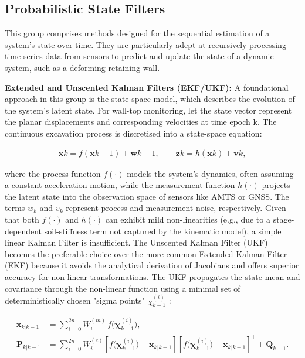 \documentclass[preprint,11pt,authoryear,3p]{elsarticle}
\begin{document}
\subsection{Probabilistic State Filters}

This group comprises methods designed for the sequential estimation of a system's state over time. They are particularly adept at recursively processing time-series data from sensors to predict and update the state of a dynamic system, such as a deforming retaining wall.

\textbf{Extended and Unscented Kalman Filters (EKF/UKF):} A foundational approach in this group is the state-space model, which describes the evolution of the system's latent state. For wall-top monitoring, let the state vector  represent the planar displacements and corresponding velocities at time epoch k. The continuous excavation process is discretised into a state-space equation:

\begin{align}
\mathbf{x}{k}=f(\mathbf{x}{k-1})+\mathbf{w}{k-1},
\qquad
\mathbf{z}{k}=h(\mathbf{x}{k})+\mathbf{v}{k},
\end{align}

where the process function $f(\cdot)$ models the system's dynamics, often assuming a constant-acceleration motion, while the measurement function $h(\cdot)$ projects the latent state into the observation space of sensors like AMTS or GNSS. The terms $w_k$ and $v_k$ represent process and measurement noise, respectively.
Given that both $f(\cdot)$ and $h(\cdot)$ can exhibit mild non-linearities (e.g., due to a stage-dependent soil-stiffness term not captured by the kinematic model), a simple linear Kalman Filter is insufficient. The Unscented Kalman Filter (UKF) becomes the preferable choice over the more common Extended Kalman Filter (EKF) because it avoids the analytical derivation of Jacobians and offers superior accuracy for non-linear transformations. The UKF propagates the state mean and covariance through the non-linear function using a minimal set of deterministically chosen "sigma points" $\chi_{k-1}^{(i)}$ \citep{khodarahmi_review_2023}:

\begin{align}
\mathbf{x}_{k|k-1} &=\sum_{i=0}^{2n} W^{(m)}_{i}\,f\!\bigl(\boldsymbol{\chi}^{(i)}_{k-1}\bigr), \\[6pt]
\mathbf{P}_{k|k-1} &=\sum_{i=0}^{2n} W^{(c)}_{i}\!\left[
      f\!\bigl(\boldsymbol{\chi}^{(i)}_{k-1}\bigr)-\mathbf{x}_{k|k-1}
\right]
\left[
      f\!\bigl(\boldsymbol{\chi}^{(i)}_{k-1}\bigr)-\mathbf{x}_{k|k-1}
\right]^{\!\mathsf T}
+\mathbf{Q}_{k-1}.
\end{align}
\end{document}
